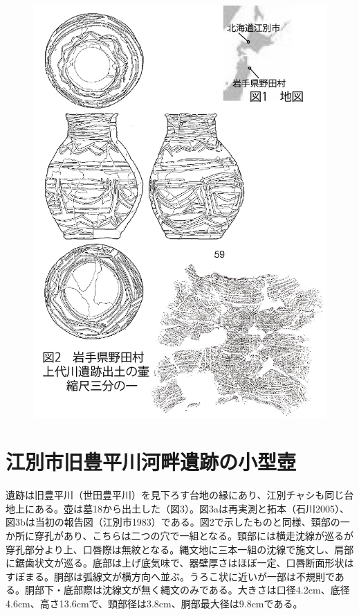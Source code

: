 \documentclass[a4j,11pt,twocolumn,openany]{jsbook}
\begin{document}
\begin{figure}[ht]
	\centering
	\includegraphics[width=\linewidth]{fig/03_Otaishi/01_otaishi.jpg}
	\label{}
	\vspace{-2\baselineskip}
\end{figure}

\section{江別市旧豊平川河畔遺跡の小型壺}
遺跡は旧豊平川（世田豊平川）を見下ろす台地の縁にあり、江別チャシも同じ台地上にある。壺は墓18から出土した（図3）。図3aは再実測と拓本（石川2005）、図3bは当初の報告図（江別市1983）である。図2で示したものと同様、頸部の一か所に穿孔があり、こちらは二つの穴で一組となる。頸部には横走沈線が巡るが穿孔部分より上、口唇際は無紋となる。縄文地に三本一組の沈線で施文し、肩部に鋸歯状文が巡る。底部は上げ底気味で、器壁厚さはほぼ一定、口唇断面形状はすぼまる。胴部は弧線文が横方向へ並ぶ。うろこ状に近いが一部は不規則である。胴部下・底部際は沈線文が無く縄文のみである。大きさは口径4.2cm、底径4.6cm、高さ13.6cmで、頸部径は3.8cm、胴部最大径は9.8cmである。
\end{document}
